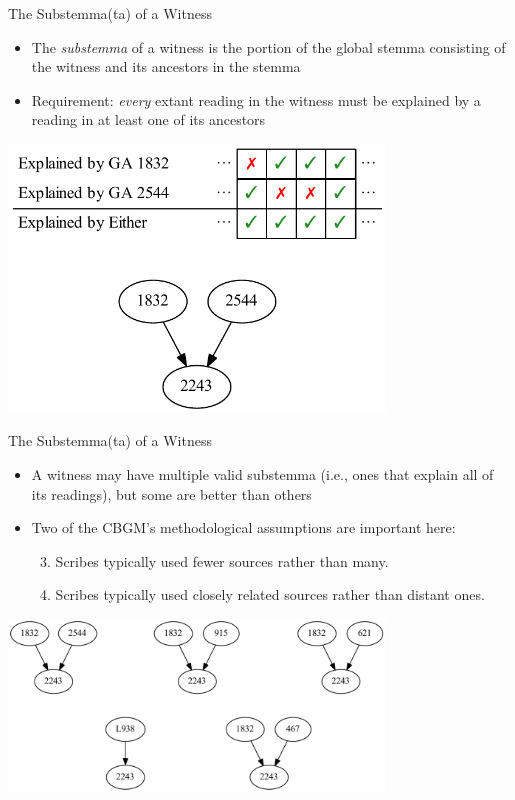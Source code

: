 \documentclass[10pt]{beamer}
\begin{document}
	\begin{frame}{The Substemma(ta) of a Witness}
		\begin{itemize}
			\item The \emph{substemma} of a witness is the portion of the global stemma consisting of the witness and its ancestors in the stemma
			\item Requirement: \emph{every} extant reading in the witness must be explained by a reading in at least one of its ancestors
		\end{itemize}
		\begin{center}
			\includegraphics[width=0.75\textwidth]{../img/ga-2243-substemma.pdf}
		\end{center}
	\end{frame}
	\begin{frame}{The Substemma(ta) of a Witness}
		\begin{itemize}
			\item A witness may have multiple valid substemma (i.e., ones that explain all of its readings), but some are better than others
			\item Two of the CBGM's methodological assumptions are important here:
			\begin{enumerate}
				\setcounter{enumi}{2} %
				\item Scribes typically used fewer sources rather than many.
				\item Scribes typically used closely related sources rather than distant ones.
			\end{enumerate}
		\end{itemize}
		\begin{center}
			\includegraphics[width=0.75\textwidth]{../img/substemmata.pdf}
		\end{center}
	\end{frame}
\end{document}
